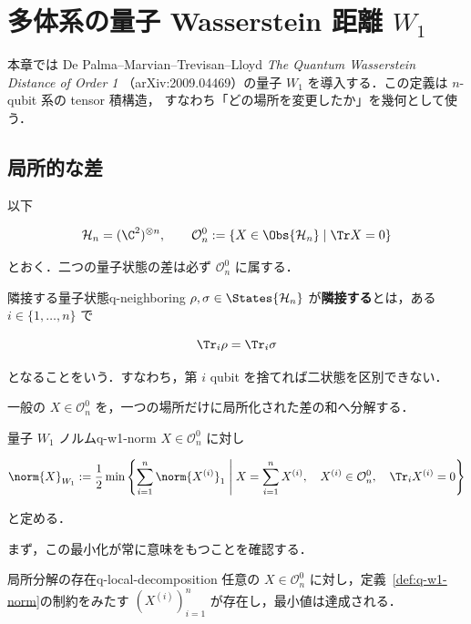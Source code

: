 \chapter{多体系の量子 Wasserstein 距離 \texorpdfstring{$W_1$}{W1}}
\label{ch:quantum-w1}

本章では De Palma--Marvian--Trevisan--Lloyd
\emph{The Quantum Wasserstein Distance of Order 1}
（arXiv:2009.04469）の量子 $W_1$ を導入する．この定義は $n$-qubit 系の tensor 積構造，
すなわち「どの場所を変更したか」を幾何として使う．

\section{局所的な差}

以下

\[
  \mathcal{H}_n=(\C^2)^{\otimes n},
  \qquad
  \mathcal{O}_n^0
  :=\{X\in\Obs{\mathcal{H}_n}\mid\Tr X=0\}
\]

とおく．二つの量子状態の差は必ず $\mathcal{O}_n^0$ に属する．

\begin{definition}{隣接する量子状態}{q-neighboring}
  $\rho,\sigma\in\States{\mathcal{H}_n}$ が\textbf{隣接する}とは，ある $i\in\{1,\ldots,n\}$ で

  \[
    \Tr_i\rho=\Tr_i\sigma
  \]

  となることをいう．すなわち，第 $i$ qubit を捨てれば二状態を区別できない．
\end{definition}

一般の $X\in\mathcal{O}_n^0$ を，一つの場所だけに局所化された差の和へ分解する．

\begin{definition}{量子 $W_1$ ノルム}{q-w1-norm}
  $X\in\mathcal{O}_n^0$ に対し

  \[
    \norm{X}_{W_1}
    :=\frac12
    \min\left\{
      \sum_{i=1}^n\norm{X^{(i)}}_1
      \;\middle|\;
      X=\sum_{i=1}^nX^{(i)},\quad
      X^{(i)}\in\mathcal{O}_n^0,\quad
      \Tr_iX^{(i)}=0
    \right\}
  \]

  と定める．
\end{definition}

まず，この最小化が常に意味をもつことを確認する．

\begin{lemma}{局所分解の存在}{q-local-decomposition}
  任意の $X\in\mathcal{O}_n^0$ に対し，定義~\ref{def:q-w1-norm}の制約をみたす
  $(X^{(i)})_{i=1}^n$ が存在し，最小値は達成される．
\end{lemma}

